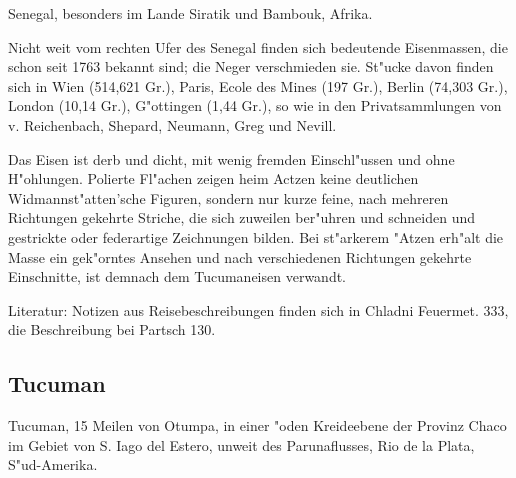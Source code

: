 \documentclass[a4paper, 11pt, oneside]{article}
\begin{document}
Senegal, besonders im Lande Siratik und Bambouk, Afrika.

Nicht weit vom rechten Ufer des Senegal finden sich bedeutende Eisenmassen, die schon seit 1763 bekannt sind; die Neger verschmieden sie. St"ucke davon finden sich in Wien (514,621 Gr.), Paris, Ecole des Mines (197 Gr.), Berlin (74,303 Gr.), London (10,14 Gr.), G"ottingen (1,44 Gr.), so wie in den Privatsammlungen von v. Reichenbach, Shepard, Neumann, Greg und Nevill.

Das Eisen ist derb und dicht, mit wenig fremden Einschl"ussen und ohne H"ohlungen. Polierte Fl"achen zeigen heim Actzen keine deutlichen Widmannst"atten'sche Figuren, sondern nur kurze feine, nach mehreren Richtungen gekehrte Striche, die sich zuweilen ber"uhren und schneiden und gestrickte oder federartige Zeichnungen bilden. Bei st"arkerem "Atzen erh"alt die Masse ein gek"orntes Ansehen und nach verschiedenen Richtungen gekehrte Einschnitte, ist demnach dem Tucumaneisen verwandt.

Literatur: Notizen aus Reisebeschreibungen finden sich in Chladni Feuermet. 333, die Beschreibung bei Partsch 130.

\subsection{Tucuman}

Tucuman, 15 Meilen von Otumpa, in einer "oden Kreideebene
der Provinz Chaco im Gebiet von S. Iago del Estero, unweit des Parunaflusses, Rio de la Plata, S"ud-Amerika.
\end{document}

